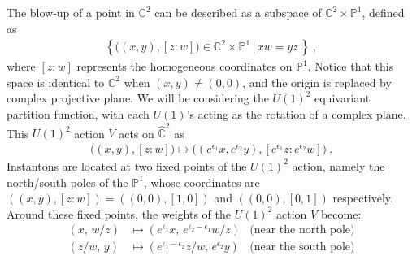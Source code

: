 \documentclass[letterpaper, 11pt]{article}
\def\IC{\mathbb{C}}
\def\IP{\mathbb{P}}
\def\e{\epsilon}
\begin{document}
 The blow-up of a point in $\IC^2$ can be described as a subspace of $\IC^2 \times \IP^1$, defined as
\begin{align}
 \left\{ \big((x, y), [z: w]\big) \in \IC^2 \times \IP^1 \,\big|\, xw = yz \,\right\} \ , 
\end{align}
where $[z:w]$ represents the homogeneous coordinates on $\IP^1$. Notice that this space is identical to $\IC^2$ when $(x, y) \neq (0, 0)$, and the origin is replaced by complex projective plane. We will be considering the $U(1)^2$ equivariant partition function, with each $U(1)$'s acting as the rotation of a complex plane. This $U(1)^2$ action $V$ acts on $\hat{\IC}^2$ as
\begin{align}
 \big((x, y), [z: w]\big) \mapsto \big((e^{ \e_1} x, e^{ \e_2} y), [e^{ \e_1} z: e^{ \e_2} w]\big) \ . 
\end{align}
Instantons are located at two fixed points of the $U(1)^2$ action, namely the north/south poles of the $\mathbb{P}^1$, whose coordinates are $((x, y), [z: w]) = ((0, 0), [1, 0])$ and $((0, 0), [0, 1])$ respectively. Around these fixed points, the weights of the $U(1)^2$ action $V$ become:
\begin{align}
  (x,\,w/z) &\mapsto  (e^{\e_1}x, \,e^{\e_2 - \e_1}w/z) &  \text{(near the north pole)}\\
  (z/w,\,y) &\mapsto  (e^{\e_1 - \e_2}z/w, \,e^{\e_2}y) &  \text{(near the south pole)}
\end{align}
\end{document}
